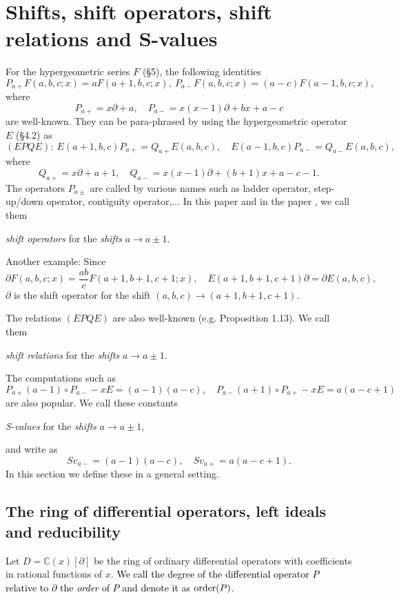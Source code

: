 \documentclass[a4paper,12pt]{article}
\theoremstyle{definition}
\theoremstyle{remark}
\numberwithin{equation}{section} %
\newcommand{\blue}[1]{\textcolor{black}{#1}}
\begin{document}
\section{Shifts, shift  operators, shift relations and S-values}\label{GenShift}\secttoc
For the hypergeometric series $F$ (\S 5), the following identities 
$$P_{a+} F(a,b,c;x)=aF(a+1,b,c;x),\ P_{a-} F(a,b,c;x)=(a-c)F(a-1,b,c;x),$$
where
$$P_{a+}=x\partial+a,\quad P_{a-}=x(x-1)\partial+bx+a-c$$
are well-known. They can be para-phrased by using the hypergeometric operator $E$ (\S 4.2) as
$$(EPQE):\ E(a+1,b,c)P_{a+}=Q_{a+}E(a,b,c),\quad E(a-1,b,c)P_{a-}=Q_{a-}E(a,b,c),$$
where 
$$Q_{a+}=x\partial +a+1,\quad Q_{a-}=x(x-1)\partial +(b+1)x+a-c-1.$$
The operators $P_{a\pm}$ are called by various names such as ladder operator, step-up/down operator, contiguity operator,... In this paper and in the paper \cite{HOSY2}, we call them 
\begin{center}{\it shift operators} for the {\it shifts} $a\to a\pm1$.
\end{center}
Another example: Since $$\partial F(a,b,c;x)=\frac{ab}cF(a+1,b+1,c+1;x),\quad E(a+1,b+1,c+1)\partial=\partial E(a,b,c),$$
$\partial$ is the shift operator for the shift $(a,b,c)\to(a+1,b+1,c+1)$.\par\smallskip
The relations $(EPQE)$ are also well-known (e.g. \cite{vPS} Proposition 1.13). We call them
\begin{center}{\it shift relations} for the {\it shifts}  $a\to a\pm1$.\end{center}
The computations such as
$$P_{a+}(a-1)\circ P_{a-}-xE=(a-1)(a-c),\quad P_{a-}(a+1)\circ P_{a+} -xE=a(a-c+1)$$ 
are also popular. We call these constants 
\begin{center}{\it S-values} for the {\it shifts} $a\to a\pm1$,
\end{center}
and write as
$$Sv_{a-}= (a-1)(a-c),\quad Sv_{a+}=a(a-c+1).$$
In this section we define these in a general setting. 
\subsection{The ring of differential operators, left ideals and reducibility}\label{GenShiftRing}
Let $D=\mathbb{C}(x)[\partial]$ be the ring of ordinary differential operators with coefficients in rational functions of $x$. \blue{We call the degree of the differential operator $P$ relative to $\partial$ the {\it order} of $P$ and denote it as ${\rm order}(P)$.}
\end{document}
